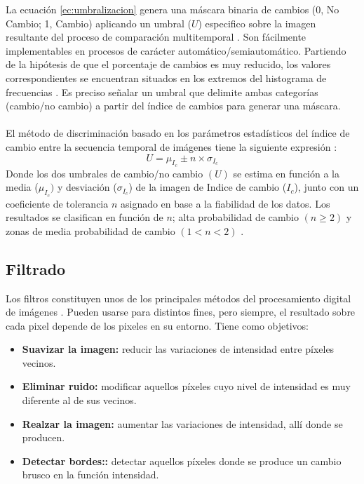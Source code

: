 La ecuaci\'on \ref{ec:umbralizacion} genera una m\'ascara binaria de cambios (0, No Cambio; 1, Cambio) aplicando un umbral ($ U $) especifico sobre la imagen resultante del proceso de comparaci\'on multitemporal \cite{singh1989review}. Son f\'acilmente implementables en procesos de car\'acter autom\'atico/semiautom\'atico. Partiendo de la hip\'otesis de que el porcentaje de cambios es muy reducido, los valores correspondientes se encuentran situados en los extremos del histograma de frecuencias \cite{estornell2004analisis}. Es preciso se\~{n}alar un umbral que delimite ambas categorías (cambio/no cambio) a partir del \'indice de cambios \cite{radke2005image} para generar una m\'ascara.\\~\\
El m\'etodo de discriminaci\'on basado en los par\'ametros estad\'isticos del \'indice de cambio entre la secuencia temporal de im\'agenes tiene la siguiente expresi\'on \cite{rodriguez2010analisis}:
\begin{equation}
U=\mu_{I_{c}} \pm n \times \sigma _{I_{c}}
\end{equation}
Donde los dos umbrales de cambio/no cambio $ (U) $ se estima en funci\'on a la media ($ \mu_{I_{c}}) $ y desviaci\'on ($ \sigma_{I_{c}} $) de la imagen de Indice de cambio ($ I_{c} $), junto con un coeficiente de tolerancia $ n $ asignado en base a la fiabilidad de los datos. Los resultados se clasifican en funci\'on de $ n $; alta probabilidad de cambio $ (n \geq 2) $ y
zonas de media probabilidad de cambio $ (1 < n < 2) $ \cite{estornell2004analisis}.

\subsection{Filtrado}
Los filtros constituyen unos de los principales m\'etodos del procesamiento digital de im\'agenes . Pueden usarse para distintos fines, pero siempre, el resultado sobre cada pixel depende de los pixeles en su entorno. Tiene como objetivos: 
	\begin{itemize}
		\item \textbf{Suavizar la imagen:} reducir las variaciones de intensidad entre p\'ixeles vecinos.
		\item \textbf{Eliminar ruido:}  modificar aquellos p\'ixeles cuyo nivel de intensidad es muy diferente al de sus vecinos.
		\item \textbf{Realzar la imagen:} aumentar las variaciones de intensidad, all\'i donde se producen.
		\item \textbf{Detectar bordes::} detectar aquellos p\'ixeles donde se produce un cambio brusco en la funci\'on intensidad.	
	\end{itemize}

